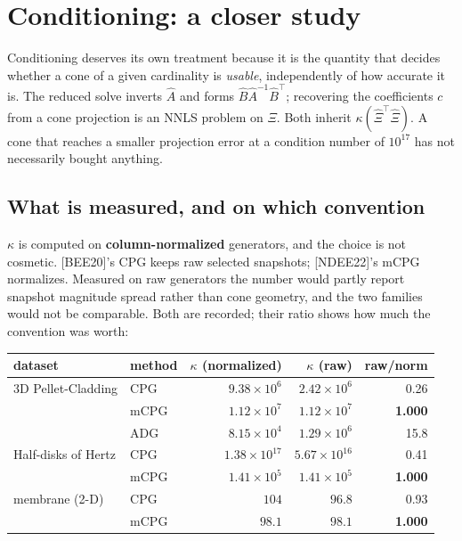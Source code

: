 \documentclass[11pt,a4paper]{article}
\newcommand{\bee}{\textsf{[BEE20]}}
\newcommand{\ndee}{\textsf{[NDEE22]}}
\begin{document}
\section{Conditioning: a closer study}\label{sec:cond}

Conditioning deserves its own treatment because it is the quantity that decides whether a
cone of a given cardinality is \emph{usable}, independently of how accurate it is. The
reduced solve inverts $\hat A$ and forms $\hat B\hat A^{-1}\hat B^{\!\top}$; recovering
the coefficients $c$ from a cone projection is an NNLS problem on $\Xi$. Both inherit
$\kappa(\hat\Xi^{\!\top}\hat\Xi)$. A cone that reaches a smaller projection error at a
condition number of $10^{17}$ has not necessarily bought anything.

\subsection{What is measured, and on which convention}
$\kappa$ is computed on \textbf{column-normalized} generators, and the choice is not
cosmetic. \bee{}'s CPG keeps raw selected snapshots; \ndee{}'s mCPG normalizes. Measured
on raw generators the number would partly report snapshot magnitude spread rather than
cone geometry, and the two families would not be comparable. Both are recorded; their
ratio shows how much the convention was worth:

\begin{center}
\begin{tabular}{@{}llrrr@{}}
\toprule
dataset & method & $\kappa$ (normalized) & $\kappa$ (raw) & raw/norm \\
\midrule
3D Pellet-Cladding & CPG  & $9.38\times10^{6}$ & $2.42\times10^{6}$ & 0.26 \\
                   & mCPG & $1.12\times10^{7}$ & $1.12\times10^{7}$ & \textbf{1.000} \\
                   & ADG  & $8.15\times10^{4}$ & $1.29\times10^{6}$ & 15.8 \\
\midrule
Half-disks of Hertz & CPG  & $1.38\times10^{17}$ & $5.67\times10^{16}$ & 0.41 \\
                    & mCPG & $1.41\times10^{5}$  & $1.41\times10^{5}$  & \textbf{1.000} \\
\midrule
membrane (2-D) & CPG & $104$ & $96.8$ & 0.93 \\
               & mCPG & $98.1$ & $98.1$ & \textbf{1.000} \\
\bottomrule
\end{tabular}
\end{center}
\end{document}
